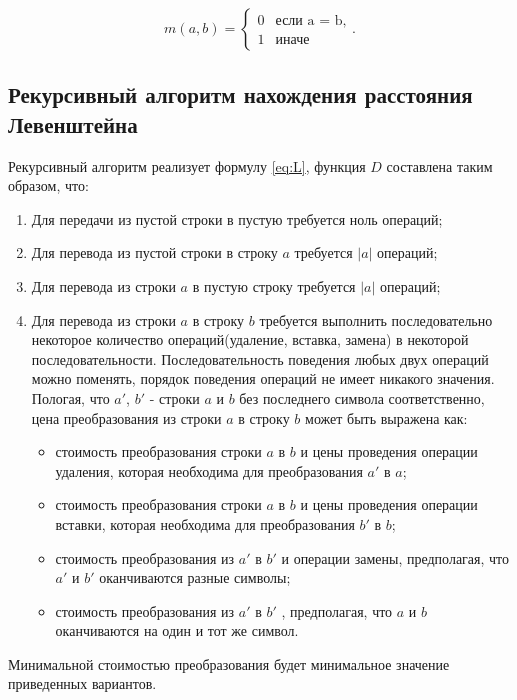 \begin{equation}
	\label{eq:m}
	m(a, b) = \begin{cases}
		0 &\text{если a = b,}\\
		1 &\text{иначе}
	\end{cases}.
\end{equation}

\subsection{Рекурсивный алгоритм нахождения расстояния Левенштейна}

Рекурсивный алгоритм реализует формулу \ref{eq:L}, функция $D$ составлена таким образом, что:
\begin{enumerate}
	\item  Для передачи из пустой строки в пустую требуется ноль операций;
	\item Для перевода из пустой строки в строку $a$ требуется $|a|$ операций;
	\item Для перевода из строки $a$ в пустую строку требуется $|a|$ операций;
	\item Для перевода из строки $a$ в строку $b$ требуется выполнить последовательно некоторое количество операций(удаление, вставка, замена) в некоторой последовательности. Последовательность поведения любых двух операций можно поменять, порядок поведения операций не имеет никакого значения. Пологая, что $a'$, $b'$ - строки $a$ и $b$ без последнего символа соответственно, цена преобразования из строки $a$ в строку $b$ может быть выражена как:
	\begin{itemize}
		\item стоимость преобразования строки $a$ в $b$ и цены проведения операции удаления, которая необходима для преобразования $a'$ в $a$;
		\item стоимость преобразования строки $a$ в $b$ и цены проведения операции вставки, которая необходима для преобразования $b'$ в $b$;
		\item стоимость преобразования из $a'$ в $b'$ и операции замены, предполагая, что $a'$ и $b'$ оканчиваются разные символы;
		\item стоимость преобразования из $a'$ в $b'$ , предполагая, что $a$ и $b$ оканчиваются на один и тот же символ.
	\end{itemize}
\end{enumerate}

Минимальной стоимостью преобразования будет минимальное значение приведенных вариантов.

